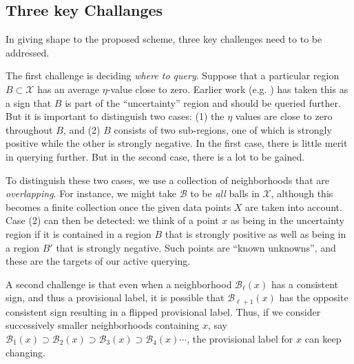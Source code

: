 \documentclass{article}
\def\X{{\mathcal X}}
\def\B{{\mathcal B}}
\begin{document}

\subsection{Three key Challanges}
In giving shape to the proposed scheme, three key challenges need to to be addressed.

The first challenge is deciding \emph{where to query}. Suppose that a
particular region $B \subset \X$ has an average $\eta$-value close to
zero. Earlier work (e.g. \cite{DH08}) has taken this as a sign that
$B$ is part of the ``uncertainty'' region and should be queried
further. But it is important to distinguish two cases: (1) the $\eta$
values are close to zero throughout $B$, and (2) $B$ consists of two
sub-regions, one of which is strongly positive while the other is
strongly negative. In the first case, there is little merit in
querying further. But in the second case, there is a lot to be gained.

To distinguish these two cases, we use a collection of neighborhoods
that are \emph{overlapping}. For instance, we might take $\B$ to be
\emph{all} balls in $\X$, although this becomes a finite collection
once the given data points $X$ are taken into account. Case (2) can
then be detected: we think of a point $x$ as being in the uncertainty
region if it is contained in a region $B$ that is strongly
positive as well as being in a region $B'$ that is strongly
negative. Such points are ``known unknowns'', and these are the
targets of our active querying.

A second challenge is that even when a neighborhood $\B_\ell(x)$ has a
consistent sign, and thus a provisional label, it is possible that
$\B_{\ell+1}(x)$ has the opposite consistent sign resulting in a flipped provisional label.
Thus, if we consider 
successively smaller neighborhoods containing $x$, say
$\B_1(x) \supset \B_2(x) \supset \B_3(x) \supset \B_4(x) \cdots$, the provisional label for $x$
can keep changing.

\end{document}
